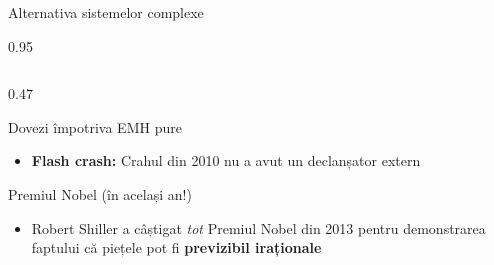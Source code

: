 \documentclass[9pt, aspectratio=169, t]{beamer}
\begin{document}
\begin{frame}{Alternativa sistemelor complexe}
\begin{cminipage}{0.95\textwidth}
{\begin{columns}[T]
\begin{column}{0.47\textwidth}
\begin{exampleblock}{Dovezi împotriva EMH pure}
\begin{itemize}
                    \item \textbf{Flash crash:} Crahul din 2010 nu a avut un declanșator extern
                \end{itemize}
            \end{exampleblock}
            \vspace{-1mm}
            \begin{block}{Premiul Nobel (în același an!)}
                \begin{itemize}\setlength{\itemsep}{0pt}
                    \item Robert Shiller a câștigat \textit{tot} Premiul Nobel din 2013 pentru demonstrarea faptului că piețele pot fi \textbf{previzibil iraționale}
                \end{itemize}
            \end{block}
        \end{column}
    \end{columns}
    }
    \end{cminipage}
\end{frame}
\end{document}
